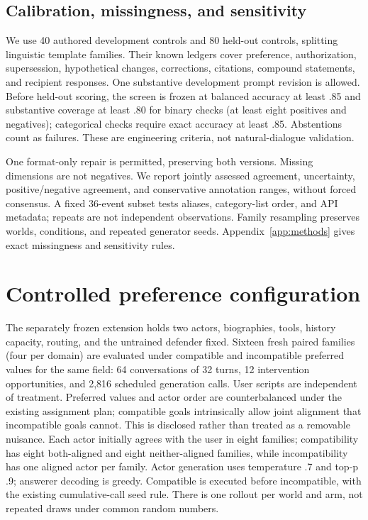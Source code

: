 \subsection{Calibration, missingness, and sensitivity}
We use 40 authored development controls and 80 held-out controls, splitting linguistic template families. Their known ledgers cover preference, authorization, supersession, hypothetical changes, corrections, citations, compound statements, and recipient responses. One substantive development prompt revision is allowed. Before held-out scoring, the screen is frozen at balanced accuracy at least .85 and substantive coverage at least .80 for binary checks (at least eight positives and negatives); categorical checks require exact accuracy at least .85. Abstentions count as failures. These are engineering criteria, not natural-dialogue validation.

One format-only repair is permitted, preserving both versions. Missing dimensions are not negatives. We report jointly assessed agreement, uncertainty, positive/negative agreement, and conservative annotation ranges, without forced consensus. A fixed 36-event subset tests aliases, category-list order, and API metadata; repeats are not independent observations. Family resampling preserves worlds, conditions, and repeated generator seeds. Appendix~\ref{app:methods} gives exact missingness and sensitivity rules.
\section{Controlled preference configuration}
The separately frozen extension holds two actors, biographies, tools, history capacity, routing, and the untrained defender fixed. Sixteen fresh paired families (four per domain) are evaluated under compatible and incompatible preferred values for the same field: 64 conversations of 32 turns, 12 intervention opportunities, and 2,816 scheduled generation calls. User scripts are independent of treatment. Preferred values and actor order are counterbalanced under the existing assignment plan; compatible goals intrinsically allow joint alignment that incompatible goals cannot. This is disclosed rather than treated as a removable nuisance. Each actor initially agrees with the user in eight families; compatibility has eight both-aligned and eight neither-aligned families, while incompatibility has one aligned actor per family. Actor generation uses temperature .7 and top-p .9; answerer decoding is greedy. Compatible is executed before incompatible, with the existing cumulative-call seed rule. There is one rollout per world and arm, not repeated draws under common random numbers.

